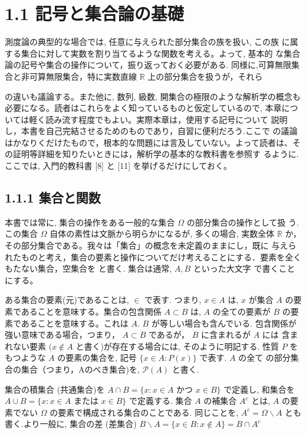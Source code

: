 \documentclass[14pt]{jsarticle}
\begin{document}
\section*{1.1 記号と集合論の基礎}
測度論の典型的な場合では, 任意に与えられた部分集合の族を扱い, この族 に属する集合に対して実数を割り当てるような関数を考える。よって, 基本的 な集合論の記号や集合の操作について，振り返っておく必要がある. 同様に,可算無限集合と非可算無限集合，特に実数直線 $\mathbb{R}$ 上の部分集合を扱うが，それら

の違いも議論する。また他に, 数列, 級数, 開集合の極限のような解析学の概念も必要になる。読者はこれらをよく知っているものと仮定しているので, 本章については軽く読み流す程度でもよい。実際本章は，使用する記号について 説明し，本書を自己完結させるためのものであり，自習に便利だろう.ここで の議論はかなりくだけたもので，根本的な問題には言及していない。よって読者は、その証明等詳細を知りたいときには，解析学の基本的な教科書を参照す るように. ここでは, 入門的教科書 [8] と [11] を挙げるだけにしておく。

\subsection*{1.1.1 集合と関数}
本書では常に, 集合の操作をある一般的な集合 $\Omega$ の部分集合の操作として扱 う. この集合 $\Omega$ 自体の素性は文脈から明らかになるが, 多くの場合, 実数全体 $\mathbb{R}$ か，その部分集合である。我々は「集合」の概念を未定義のままにし，既に 与えられたものと考え，集合の要素と操作についてだけ考えることにする．要素を全くもたない集合，空集合を と書く. 集合は通常, $A, B$ といった大文字 で書くことにする。

ある集合の要素(元)であることは, $\in$ で表す. つまり, $x \in A$ は, $x$ が集合 $A$ の要素であることを意味する。集合の包含関係 $A \subset B$ は, $A$ の全ての要素が $B$ の要素であることを意味する。これは $A$. $B$ が等しい場合も含んでいる. 包含関係が強い意味である場合，つまり， $A \subset B$ であるが， $B$ に含まれるが $A$ には 含まれない要素 $(x \notin A$ と書く)が存在する場合には, そのように明記する. 性質 $P$ をもつような $A$ の要素の集合を, 記号 $\{x \in A: P(x)\}$ で表す. $A$ の全て の部分集合の集合（つまり，Aのべき集合)を, $\mathcal{P}(A)$ と書く.

集合の積集合 (共通集合)を $A \cap B=\{x: x \in A$ かつ $x \in B\}$ で定義し, 和集合を $A \cup B=\{x: x \in A$ または $x \in B\}$ で定義する. 集合 $A$ の補集合 $A^{c}$ とは, $A$ の要素でない $\Omega$ の要素で構成される集合のことである. 同じことを, $A^{c}=\Omega \backslash A$ とも書く.より一般に, 集合の差 (差集合) $B \backslash A=\{x \in B: x \notin A\}=B \cap A^{c}$
\end{document}
